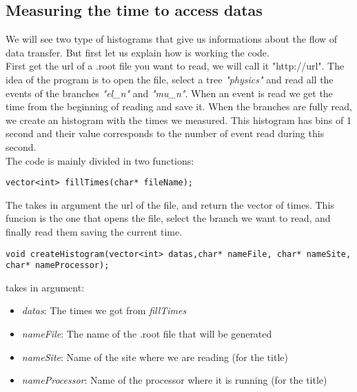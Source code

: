 \subsection{Measuring the time to access datas}

We will see two type of histograms that give us informations about the flow of data transfer. But first let us explain how is working the code.\\

First get the url of a .root file you want to read, we will call it "http://url". The idea of the program is to open the file, select a tree \textit{"physics"} and read all the events of the branches \textit{"el\_n"} and \textit{"mu\_n"}. When an event is read we get the time from the beginning of reading and save it. When the branches are fully read, we create an histogram with the times we measured. This histogram has bins of 1 second and their value corresponds to the number of event read during this second.\\

The code is mainly divided in two functions:

\lstset{language=c++}
\begin{lstlisting}[frame=single,framerule=0pt]
	vector<int> fillTimes(char* fileName);
\end{lstlisting}

The takes in argument the url of the file, and return the vector of times. This funcion is the one that opens the file, select the branch we want to read, and finally read them saving the current time.\\


\begin{lstlisting}[frame=single,framerule=0pt]
	void createHistogram(vector<int> datas,char* nameFile, char* nameSite, char* nameProcessor);
\end{lstlisting}

takes in argument:

\begin{itemize}
	\item \textit{datas}: The times we got from \textit{fillTimes}
	\item \textit{nameFile}: The name of the .root file that will be generated
	\item \textit{nameSite}: Name of the site where we are reading (for the title)
	\item \textit{nameProcessor}: Name of the processor where it is running (for the title)
\end{itemize}

